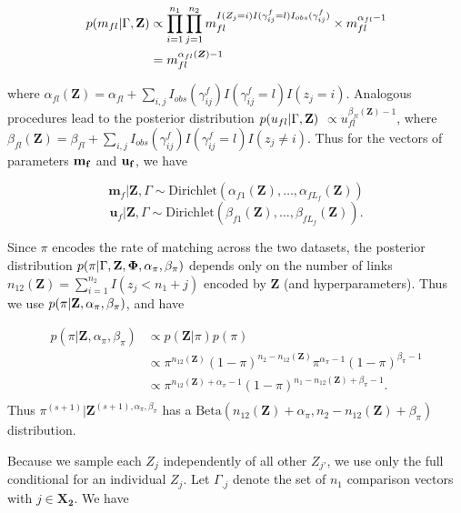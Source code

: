 \documentclass[ba]{imsart}
\begin{document}
\begin{align*}
	p(m_{fl}| \Gamma, \bf{Z}) &\propto \prod_{i=1}^{n_1} \prod_{j=1}^{n_2} m_{fl}^{I(Z_j = i) I(\gamma_{ij}^f = l) I_{obs}(\gamma_{ij}^f)} \times  m_{fl}^{\alpha_{fl} - 1} \\
	&= m_{fl}^{\alpha_{fl}(\bm{Z}) - 1}
\end{align*}

where $\alpha_{fl}(\bm{Z})= \alpha_{fl} + \sum_{i,j} I_{obs}(\gamma_{ij}^f)I(\gamma_{ij}^f = l) I(z_j = i)$. Analogous procedures lead to the posterior distribution $p(u_{fl}| \Gamma, \bf{Z})$  $\propto u_{fl}^{\beta_{fl}(\bm{Z}) - 1}$, where $\beta_{fl}(\bm{Z})= \beta_{fl} + \sum_{i,j} I_{obs}(\gamma_{ij}^f)I(\gamma_{ij}^f = l) I(z_j \neq i)$. Thus for the vectors of parameters $\bf{m}_f$ and $\bf{u}_f$, we have

$$\bm{m}_f|\bm{Z}, \Gamma \sim \text{Dirichlet}(\alpha_{f1}(\bm{Z}), \ldots, \alpha_{fL_f}(\bm{Z}))$$
$$\bm{u}_f|\bm{Z}, \Gamma \sim \text{Dirichlet}(\beta_{f1}(\bm{Z}), \ldots, \beta_{fL_f}(\bm{Z})).$$

Since $\pi$ encodes the rate of matching across the two datasets, the posterior distribution $p(\pi|\Gamma, \bf{Z}, \Phi, \alpha_{\pi}, \beta_{\pi})$ depends only on the number of links $n_{12}(\bm{Z}) = \sum_{i=1}^{n_2}I(z_j < n_1 + j)$ encoded by $\bm{Z}$ (and hyperparameters). Thus we use $p(\pi | \bf{Z}, \alpha_{\pi}, \beta_{\pi})$, and have 


\begin{align*}
	p(\pi | \bm{Z}, \alpha_{\pi}, \beta_{\pi}) &\propto p(\bm{Z}|\pi)p(\pi) \\
	&\propto \pi^{n_{12}(\bm{Z})} (1-\pi)^{n_2 - n_{12}(\bm{Z})} \pi^{\alpha_{\pi} -1} (1-\pi)^{\beta_{\pi} -1} \\
	&\propto \pi^{n_{12}(\bm{Z}) + \alpha_{\pi} - 1} (1-\pi)^{n_1 - n_{12}(\bm{Z}) + \beta_{\pi} -1}. \\
\end{align*}
Thus $\pi^{(s+1)}|\bm{Z}^{(s+1),  \alpha_{\pi}, \beta_{\pi}}$ has a $\text{Beta}(n_{12}(\bm{Z}) + \alpha_{\pi}, n_2 - n_{12}(\bm{Z}) + \beta_{\pi})$ distribution.

Because we sample each \(Z_j\) independently of all other \(Z_{j'}\), we use only the full conditional for an individual \(Z_j\). Let \(\Gamma_{.j}\) denote the set of \(n_1\) comparison vectors with \(j \in \bm{X_2}\). We have
\end{document}
